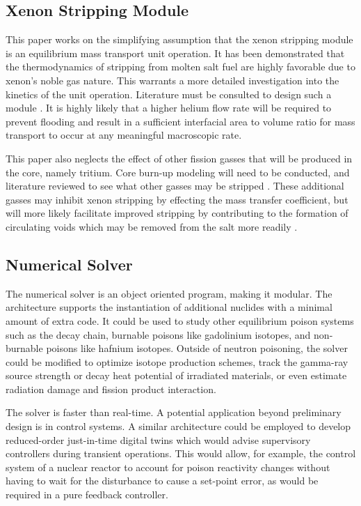 \subsection{Xenon Stripping Module}
This paper works on the simplifying assumption that the xenon stripping module is an equilibrium mass transport unit operation. It has been demonstrated that the thermodynamics of \Xe stripping from molten salt fuel are highly favorable due to xenon's noble gas nature. This warrants a more detailed investigation into the kinetics of the unit operation. Literature must be consulted to design such a module \cite[Ch. 10]{Geankoplis}. It is highly likely that a higher helium flow rate will be required to prevent flooding and result in a sufficient interfacial area to volume ratio for mass transport to occur at any meaningful macroscopic rate. 

This paper also neglects the effect of other fission gasses that will be produced in the core, namely tritium. Core burn-up modeling will need to be conducted, and literature reviewed to see what other gasses may be stripped \cite{Offgas}. These additional gasses may inhibit xenon stripping by effecting the mass transfer coefficient, but will more likely facilitate improved stripping by contributing to the formation of circulating voids which may be removed from the salt more readily \cite{XeMSR}. 

\subsection{Numerical Solver}
The numerical solver is an object oriented program, making it modular. The architecture supports the instantiation of additional nuclides with a minimal amount of extra code. It could be used to study other equilibrium poison systems such as the \Sm decay chain, burnable poisons like gadolinium isotopes, and non-burnable poisons like hafnium isotopes. Outside of neutron poisoning, the solver could be modified to optimize isotope production schemes, track the gamma-ray source strength or decay heat potential of irradiated materials, or even estimate radiation damage and fission product interaction.

The solver is faster than real-time. A potential application beyond preliminary design is in control systems. A similar architecture could be employed to develop reduced-order just-in-time digital twins which would advise supervisory controllers during transient operations. This would allow, for example, the control system of a nuclear reactor to account for poison reactivity changes without having to wait for the disturbance to cause a set-point error, as would be required in a pure feedback controller.



